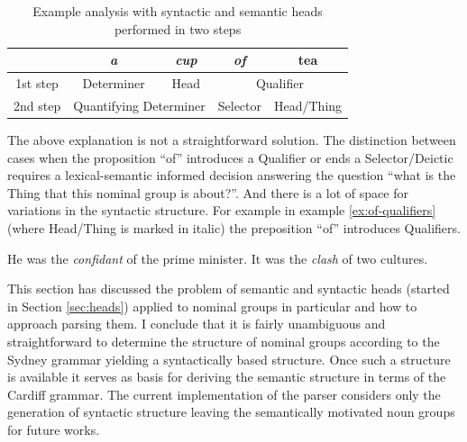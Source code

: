 \begin{table}[!ht]
    \centering
    \begin{tabular}{c|c|c|c|c|}
    \cline{2-5}
     & \textit{a} & \textit{cup} & \textit{of} & tea \\ \hline
    \multicolumn{1}{|c|}{1st step} & Determiner & Head & \multicolumn{2}{c|}{Qualifier} \\ \hline
    \multicolumn{1}{|c|}{2nd step} & \multicolumn{2}{c|}{Quantifying Determiner} & Selector & Head/Thing \\ \hline
    \end{tabular}
    \caption{Example analysis with syntactic and semantic heads performed in two steps}
    \label{tab:exmaple-analisys-parsing-syn-sem-heads}
\end{table}

The above explanation is not a straightforward solution. The distinction between cases when the proposition ``of'' introduces a Qualifier or ends a Selector/Deictic requires a lexical-semantic informed decision answering the question ``what is the Thing that this nominal group is about?''. And there is a lot of space for variations in the syntactic structure. For example in example \ref{ex:of-qualifiers} (where Head/Thing is marked in italic) the preposition ``of'' introduces Qualifiers.
 
 \begin{exe}
    \ex \label{ex:of-qualifiers}He was the \textit{confidant} of the prime minister.
    \ex It was the \textit{clash} of two cultures.
\end{exe}

This section has discussed the problem of semantic and syntactic heads (started in Section \ref{sec:heads}) applied to nominal groups in particular and how to approach parsing them. I conclude that it is fairly unambiguous and straightforward to determine the structure of nominal groups according to the Sydney grammar yielding a syntactically based structure. Once such a structure is available it serves as basis for deriving the semantic structure in terms of the Cardiff grammar. The current implementation of the parser considers only the generation of syntactic structure leaving the semantically motivated noun groups for future works.

%
	
